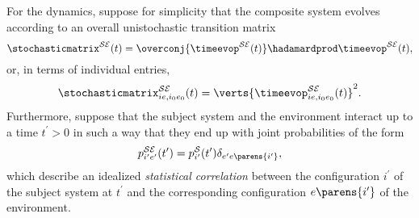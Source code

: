 \documentclass[12pt,english,prl,superscriptaddress,nobibnotes,nofootinbib]{revtex4-2}
\let\originalleft\left
\let\originalright\right
\renewcommand{\left}{\mathopen{}\mathclose\bgroup\originalleft}
\renewcommand{\right}{\aftergroup\egroup\originalright}
\begin{document}
For the dynamics, suppose for simplicity that the composite system
evolves according to an overall unistochastic transition matrix 
\begin{equation}
\stochasticmatrix^{\mathcal{S}\mathcal{E}}\left(t\right)=\overconj{\timeevop^{\mathcal{S}\mathcal{E}}\left(t\right)}\hadamardprod\timeevop^{\mathcal{S}\mathcal{E}}\left(t\right),\label{eq:CompositeSubjectEnvironmentUnistochasticMatrixFromSchurHadamardFactorization}
\end{equation}
 or, in terms of individual entries, 
\begin{equation}
\stochasticmatrix_{ie,i_{0}e_{0}}^{\mathcal{S}\mathcal{E}}\left(t\right)=\verts{\timeevop_{ie,i_{0}e_{0}}^{\mathcal{S}\mathcal{E}}\left(t\right)}^{2}.\label{eq:CompositeSubjectEnvironmentUnistochasticMatrixFromAbsValSquareUnitary}
\end{equation}
 Furthermore, suppose that the subject system and the environment
interact up to a time $t^{\prime}>0$ in such a way that they end
up with joint probabilities of the form 
\begin{equation}
p_{i^{\prime}e^{\prime}}^{\mathcal{S}\mathcal{E}}\left(t^{\prime}\right)=p_{i^{\prime}}^{\mathcal{S}}\left(t^{\prime}\right)\delta_{e^{\prime}e\parens{i^{\prime}}},\label{eq:CompositeSubjectEnvironmentIntermedJointProbabilitiesCorrelated}
\end{equation}
 which describe an idealized \emph{statistical correlation} between
the configuration $i^{\prime}$ of the subject system at $t^{\prime}$
and the corresponding configuration $e\parens{i^{\prime}}$ of the
environment. 
\end{document}
